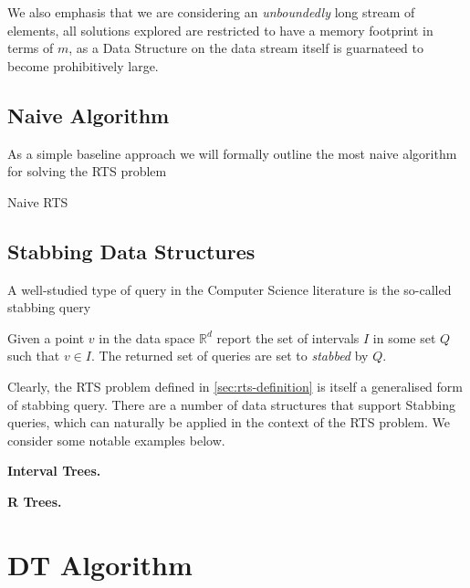 We also emphasis that we are considering an \textit{unboundedly} long stream of elements, all solutions explored are restricted to have a memory footprint in terms of $m$, as a Data Structure on the data stream itself is guarnateed to become prohibitively large.

\subsection{Naive Algorithm}
\label{sec:naive-algorithm}

As a simple baseline approach we will formally outline the most naive algorithm for solving the RTS problem

\begin{algorithm}
\caption{Naive RTS}\label{alg:naive-rts}
\begin{algorithmic}[1]
\State {}
\State {}
\State {}
\EndFor
\EndFor
\EndProcedure
\end{algorithmic}
\end{algorithm}

\subsection{Stabbing Data Structures}
\label{sec:stabbing-data-structs}

A well-studied type of query in the Computer Science literature is the so-called stabbing query

\begin{definition} Given a point $v$ in the data space $\mathbb{R}^d$ report the set of intervals $I$ in some set $Q$ such that $v \in I$. The returned set of queries are set to \textit{stabbed} by $Q$.
\end{definition}

Clearly, the RTS problem defined in \cref{sec:rts-definition} is itself a generalised form of stabbing query. There are a number of data structures \cite{DBLP:conf/soda/Rahul15} that support Stabbing queries, which can naturally be applied in the context of the RTS problem. We consider some notable examples below. 

\textbf{Interval Trees.}

\textbf{R Trees.}

\section{DT Algorithm}
\label{sec:DT-algorithm}

